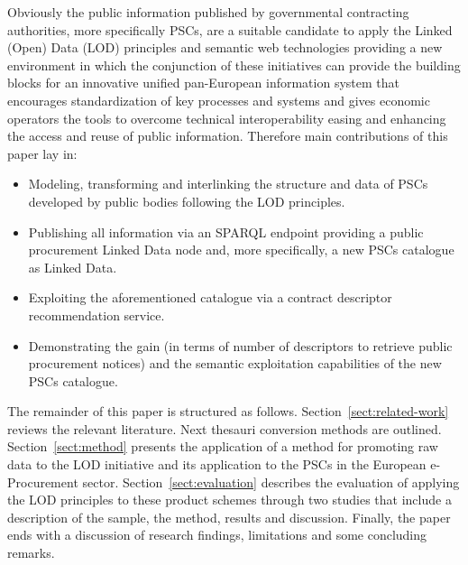 Obviously the public information published by governmental contracting authorities, more specifically PSCs, are a suitable candidate to apply the Linked (Open) Data 
(LOD) principles and semantic web technologies providing a new environment in which the conjunction of these initiatives can provide the building blocks for an 
innovative unified pan-European information system that encourages standardization of key processes and systems and gives economic operators the tools to overcome 
technical interoperability easing and enhancing the access and reuse of public information. Therefore main contributions of this paper lay in:
\begin{itemize}
\item Modeling, transforming and interlinking the structure and data of PSCs developed by public bodies following the LOD principles.
\item Publishing all information via an SPARQL endpoint providing a public procurement Linked Data node and, more specifically, a new PSCs catalogue as Linked Data.
\item Exploiting the aforementioned catalogue via a contract descriptor recommendation service.
\item Demonstrating the gain (in terms of number of descriptors to retrieve public procurement notices) and the semantic exploitation 
capabilities of the new PSCs catalogue.
\end{itemize}

The remainder of this paper is structured as follows. Section~\ref{sect:related-work} reviews the relevant literature. Next thesauri 
conversion methods are outlined. Section~\ref{sect:method} presents the application of a method for promoting raw data to the LOD initiative 
and its application to the PSCs in the European e-Procurement sector. Section~\ref{sect:evaluation} describes the evaluation of applying the LOD principles to 
these product schemes through two studies that include a description of the sample, the method, results and discussion. Finally, 
the paper ends with a discussion of research findings, limitations and some concluding remarks.
